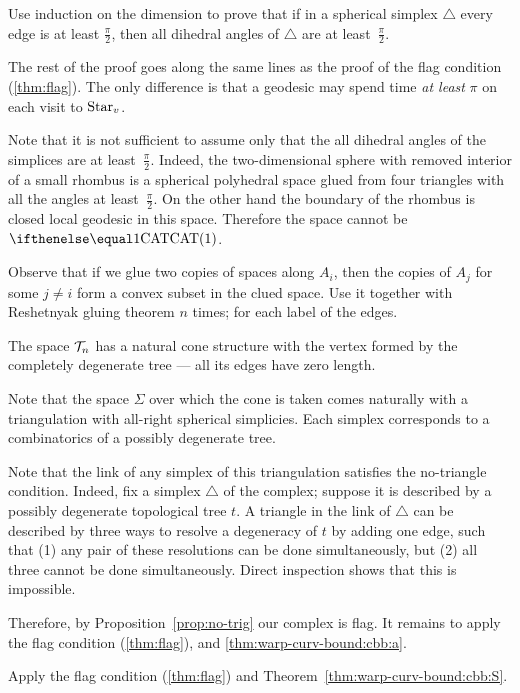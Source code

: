 Use induction on the dimension  to prove that if in a spherical simplex $\triangle$ every edge is at least $\tfrac\pi2$, then 
all dihedral angles of $\triangle$ are at least~$\tfrac\pi2$.

The rest of the proof goes along the same lines as the proof of the flag condition (\ref{thm:flag}).
The only difference is that a geodesic may spend time {}\emph{at least} $\pi$ on each visit to $\mathop{\rm Star}\nolimits_v$.

Note that it is not sufficient to assume only that the all dihedral angles of the simplices are at least~$\tfrac\pi2$. 
Indeed, the two-dimensional sphere with removed interior of a small rhombus is a spherical polyhedral space glued from four triangles with all the angles at least~$\tfrac\pi2$.
On the other hand the boundary of the rhombus is closed local geodesic in this space.
Therefore the space cannot be $\CAT1$.

Observe that if we glue two copies of spaces along $A_i$, then the copies of $A_j$ for some $j\ne i$ form a convex subset in the clued space.
Use it together with Reshetnyak gluing theorem $n$ times; for each label of the edges.

The space $\mathcal{T}_n$ has a natural cone structure with the vertex formed by the  completely degenerate tree --- all its edges have zero length.

Note that the space $\Sigma$
over which the cone is taken comes naturally with a triangulation 
with all-right spherical simplicies.
Each simplex corresponds to a combinatorics of a possibly degenerate tree.

Note that the link of any simplex of this triangulation satisfies the no-triangle condition.
Indeed, fix a simplex $\triangle$ of the complex;
suppose it is described by a possibly degenerate topological tree $t$.
A triangle in the link of  $\triangle$ can be described by three ways to resolve a degeneracy of $t$ by adding one edge,
such that (1) any pair of these resolutions can be done simultaneously, but (2) all three cannot be done simultaneously.
Direct inspection shows that this is impossible.

Therefore, by Proposition~\ref{prop:no-trig} our complex is flag.
It remains to apply the flag condition (\ref{thm:flag}), and \ref{thm:warp-curv-bound:cbb:a}.

Apply the flag condition (\ref{thm:flag}) and Theorem~\ref{thm:warp-curv-bound:cbb:S}.

